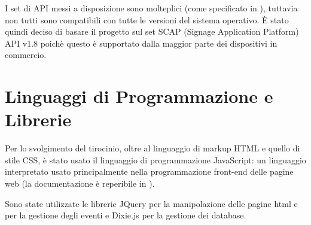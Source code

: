 I set di API messi a disposizione sono molteplici (come specificato in \cite{LgDoc}), tuttavia non tutti sono compatibili con tutte le versioni del sistema operativo. È stato quindi deciso di basare il progetto sul set SCAP (Signage Application Platform) API v1.8 poichè questo è supportato dalla maggior parte dei dispositivi in commercio.


\section{Linguaggi di Programmazione e Librerie}

Per lo svolgimento del tirocinio, oltre al linguaggio di markup HTML e quello di stile CSS, è stato usato il linguaggio di programmazione JavaScript: un linguaggio interpretato usato principalmente nella programmazione front-end delle pagine web (la documentazione è reperibile in \cite{MdN}).

Sono state utilizzate le librerie JQuery \cite{jQDoc} per la manipolazione delle pagine html e per la gestione degli eventi e Dixie.js \cite{dixie} per la gestione dei database.



